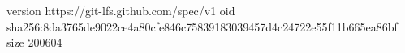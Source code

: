 version https://git-lfs.github.com/spec/v1
oid sha256:8da3765de9022ce4a80cfe846c75839183039457d4c24722e55f11b665ea86bf
size 200604
